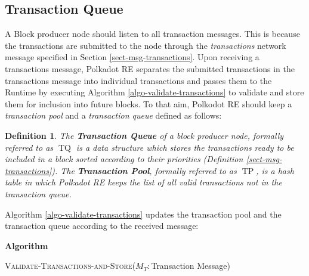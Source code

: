 \documentclass{book}
\newcommand{\tmem}[1]{{\em #1\/}}
\newcommand{\tmname}[1]{\textsc{#1}}
\newcommand{\tmop}[1]{\ensuremath{\operatorname{#1}}}
\newcommand{\tmstrong}[1]{\textbf{#1}}
\newcommand{\tmtextbf}[1]{{\bfseries{#1}}}
\newcommand{\tmtextit}[1]{{\itshape{#1}}}
\newcommand{\tmtextsc}[1]{{\scshape{#1}}}
\newcommand{\tmtextup}[1]{{\upshape{#1}}}
\newenvironment{tmindent}{\begin{tmparmod}{1.5em}{0pt}{0pt}}{\end{tmparmod}}
\newenvironment{tmparmod}[3]{\begin{list}{}{\setlength{\topsep}{0pt}\setlength{\leftmargin}{#1}\setlength{\rightmargin}{#2}\setlength{\parindent}{#3}\setlength{\listparindent}{\parindent}\setlength{\itemindent}{\parindent}\setlength{\parsep}{\parskip}} \item[]}{\end{list}}
\newenvironment{tmparsep}[1]{\begingroup\setlength{\parskip}{#1}}{\endgroup}
\newcounter{tmcounter}
\newcommand{\custombinding}[1]{%
  \setcounter{tmcounter}{#1}%
  \addtocounter{tmcounter}{-1}%
  \refstepcounter{tmcounter}}
\newtheorem{definition}{Definition}
\providecommand{\tmem}[1]{\tmtextit{#1}}
\providecommand{\tmname}[1]{\tmtextsc{#1}}
\providecommand{\tmop}[1]{\ensuremath{\mathrm{#1}}}
\providecommand{\tmstrong}[1]{\tmtextbf{#1}}
\providecommand{\tmtextbf}[1]{\tmtextbf{#1}}
\providecommand{\tmtextit}[1]{\tmtextit{#1}}
\newtheorem{definition}{Definition}
\begin{document}
\subsection{Transaction Queue}

A Block producer node should listen to all transaction
messages{\tmem{{}}}. This is because the
transactions are submitted to the node through the {\tmem{transactions}}
network message specified in Section \ref{sect-msg-transactions}. Upon
receiving a transactions message, Polkadot RE separates the submitted
transactions in the transactions message into individual transactions and
passes them to the Runtime by executing Algorithm
\ref{algo-validate-transactions} to validate and store them for inclusion into
future blocks. To that aim, Polkodot RE should keep a {\tmem{transaction
pool{}}} and a {\tmem{transaction
queue}}{} defined as follows:

\begin{definition}
  \label{defn-transaction-queue}The {\tmstrong{Transaction Queue}} of a block
  producer node, formally referred to as $\tmop{TQ}$ is a data structure which
  stores the transactions ready to be included in a block sorted according to
  their priorities (Definition \ref{sect-msg-transactions}). The
  {\tmstrong{Transaction Pool}}, formally referred to as $\tmop{TP}$, is a
  hash table in which Polkadot RE keeps the list of all valid transactions not
  in the transaction queue.
\end{definition}

Algorithm \ref{algo-validate-transactions} updates the transaction pool and
the transaction queue according to the received message:

\custombinding{4}{\noindent}\begin{tmparmod}{0pt}{0pt}{0em}%
  \begin{tmparsep}{0em}%
    \tmtextbf{Algorithm \tmtextup{4}}{\smallskip}
    
    \begin{tmindent}
      \label{algo-validate-transactions}{\tmname{Validate-Transactions-and-Store}}($M_T
      :$Transaction Message)
    \end{tmindent}
  \end{tmparsep}
\end{tmparmod}{\medskip}
\end{document}
